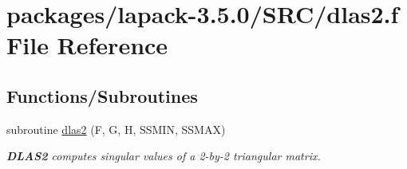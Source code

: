 \hypertarget{dlas2_8f}{}\section{packages/lapack-\/3.5.0/\+S\+R\+C/dlas2.f File Reference}
\label{dlas2_8f}
\subsection*{Functions/\+Subroutines}
\begin{DoxyCompactItemize}
\item 
subroutine \hyperlink{group__auxOTHERauxiliary_ga307400bc17cbe31b5b8827a2802efae4}{dlas2} (F, G, H, S\+S\+M\+I\+N, S\+S\+M\+A\+X)
\begin{DoxyCompactList}\small\item\em {\bfseries D\+L\+A\+S2} computes singular values of a 2-\/by-\/2 triangular matrix. \end{DoxyCompactList}\end{DoxyCompactItemize}
